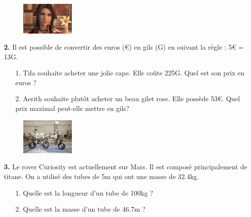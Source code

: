 \begin{minipage}[t]{0.25\textwidth}
  \begin{figure}[H]
    \centering
    \includegraphics[width=100px]{4x3-proportionnalite/ex2.jpg}
  \end{figure}
\end{minipage}
\begin{minipage}[t]{0.75\textwidth}
\textbf{2.} Il est possible de convertir des euros (€) en gils (G) en suivant la règle : 5€ = 13G.

\begin{enumerate}
  \item[1.] Tifa souhaite acheter une jolie cape. Elle coûte 225G. Quel est son prix en euros ? 
  \item[2.] Aerith souhaite plutôt acheter un beau gilet rose. Elle possède 53€. Quel prix maximal peut-elle mettre en gils?
\end{enumerate}

\Pointilles[1]
\end{minipage}

\Pointilles[7]

\begin{minipage}[t]{0.25\textwidth}
  \begin{figure}[H]
    \centering
    \includegraphics[width=100px]{4x3-proportionnalite/ex3.jpg}
  \end{figure}
\end{minipage}
\begin{minipage}[t]{0.75\textwidth}
\textbf{3.} Le rover Curiosity est actuellement sur Mars. Il est composé principalement de titane. On a utilisé des tubes de 5m qui ont une masse de 32.4kg. 

\begin{enumerate}
  \item[1.] Quelle est la longueur d'un tube de 100kg ?
  \item[2.] Quelle est la masse d'un tube de 46.7m ? 
\end{enumerate}

\Pointilles[3]
\end{minipage}

